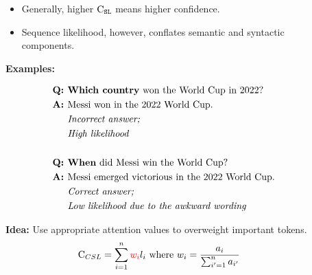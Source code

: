 \documentclass[final]{beamer}
\newlength{\sepwid}
\newlength{\leftcolwid}
\newlength{\midcolwid}
\begin{document}
\begin{frame}[containsverbatim,t]
\begin{columns}[t]
\begin{column}{\leftcolwid}
\begin{block}{\color{mydarkgreen}{Background: Sequence Likelihood}}
\begin{itemize}
\item 
Generally, higher $\text{C}_{\texttt{SL}}$ means higher confidence.

\item 
Sequence likelihood, however, conflates semantic and syntactic components.\\

\end{itemize}
\textbf{Examples:}
\begin{figure}[ht]
\begin{minipage}{0.5\textwidth}
{\small
\begin{align*}
\textbf{Q: } &\text{\textbf{Which country} won the World Cup in 2022?}\\
\textbf{A: } &\text{Messi won in the 2022 World Cup.}\\
& \textit{Incorrect answer;}\\
& \textit{High likelihood}\\\\
\textbf{Q: } &\text{\textbf{When} did Messi win the World Cup?}\\
\textbf{A: } &\text{Messi emerged victorious in the 2022 World Cup.}\\
& \textit{Correct answer;}\\
& \textit{Low likelihood due to the awkward wording}
\end{align*}
}
\end{minipage}
\end{figure}

\end{block}

\begin{block}{\color{mydarkgreen}{Contextualized Sequence Likelihood}}
\textbf{Idea:} Use appropriate attention values to overweight important tokens.
\begin{align}
    \text{C}_{CSL} = 
    \sum_{i=1}^n {{\color{red}w_i}} l_i 
    \text{ where } & w_i = \frac{a_{i}}{\sum_{i'=1}^n a_{i'}} \label{eq:main}
\end{align}
\end{block}
\end{column} %

\begin{column}{\sepwid}\end{column} %

\begin{column}{\midcolwid} %


\end{column}
\end{columns}
\end{frame}
\end{document}
